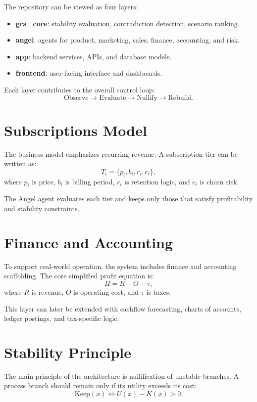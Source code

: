 \documentclass[11pt,a4paper]{article}
\begin{document}
The repository can be viewed as four layers:
\begin{itemize}[leftmargin=1.2cm]
    \item \textbf{gra\_core}: stability evaluation, contradiction detection, scenario ranking.
    \item \textbf{angel}: agents for product, marketing, sales, finance, accounting, and risk.
    \item \textbf{app}: backend services, APIs, and database models.
    \item \textbf{frontend}: user-facing interface and dashboards.
\end{itemize}

Each layer contributes to the overall control loop:
\[
\text{Observe} \rightarrow \text{Evaluate} \rightarrow \text{Nullify} \rightarrow \text{Rebuild}.
\]

\section{Subscriptions Model}

The business model emphasizes recurring revenue. A subscription tier can be written as:
\[
T_i = \{p_i, b_i, r_i, c_i\},
\]
where $p_i$ is price, $b_i$ is billing period, $r_i$ is retention logic, and $c_i$ is churn risk.

The Angel agent evaluates each tier and keeps only those that satisfy profitability and stability constraints.

\section{Finance and Accounting}

To support real-world operation, the system includes finance and accounting scaffolding. The core simplified profit equation is:
\[
\Pi = R - O - \tau,
\]
where $R$ is revenue, $O$ is operating cost, and $\tau$ is taxes.

This layer can later be extended with cashflow forecasting, charts of accounts, ledger postings, and tax-specific logic.

\section{Stability Principle}

The main principle of the architecture is nullification of unstable branches. A process branch should remain only if its utility exceeds its cost:
\[
\text{Keep}(x) \iff U(x) - K(x) > 0.
\]
\end{document}
